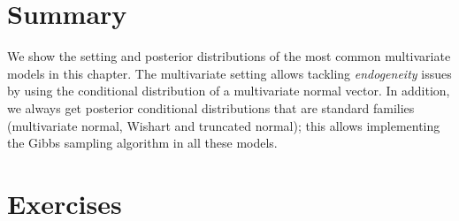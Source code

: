 \section{Summary}\label{sec75}
We show the setting and posterior distributions of the most common multivariate models in this chapter. The multivariate setting allows tackling \textit{endogeneity} issues by using the conditional distribution of a multivariate normal vector. In addition, we always get posterior conditional distributions that are standard families (multivariate normal, Wishart and truncated normal); this allows implementing the Gibbs sampling algorithm in all these models. 

\section{Exercises}\label{sec76}

